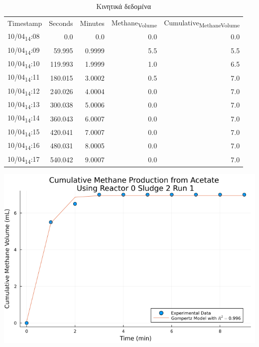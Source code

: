 \documentclass[11pt]{article}
\begin{document}
\begin{table}[htbp]
\caption{Κινητικά δεδομένα}
\centering
\begin{tabular}{lrrrr}
Timestamp & Seconds & Minutes & Methane\textsubscript{Volume} & Cumulative\textsubscript{Methane}\textsubscript{Volume}\\[0pt]
10/04\textsubscript{14}:08 & 0.0 & 0.0 & 0.0 & 0.0\\[0pt]
10/04\textsubscript{14}:09 & 59.995 & 0.9999 & 5.5 & 5.5\\[0pt]
10/04\textsubscript{14}:10 & 119.993 & 1.9999 & 1.0 & 6.5\\[0pt]
10/04\textsubscript{14}:11 & 180.015 & 3.0002 & 0.5 & 7.0\\[0pt]
10/04\textsubscript{14}:12 & 240.026 & 4.0004 & 0.0 & 7.0\\[0pt]
10/04\textsubscript{14}:13 & 300.038 & 5.0006 & 0.0 & 7.0\\[0pt]
10/04\textsubscript{14}:14 & 360.043 & 6.0007 & 0.0 & 7.0\\[0pt]
10/04\textsubscript{14}:15 & 420.041 & 7.0007 & 0.0 & 7.0\\[0pt]
10/04\textsubscript{14}:16 & 480.031 & 8.0005 & 0.0 & 7.0\\[0pt]
10/04\textsubscript{14}:17 & 540.042 & 9.0007 & 0.0 & 7.0\\[0pt]
\end{tabular}
\end{table}

\begin{center}
\includegraphics[width=.9\linewidth]{../plots/BMPs/Acetate/methane_kinetics_acet_test_0_s2_min.png}
\end{center}
\end{document}
